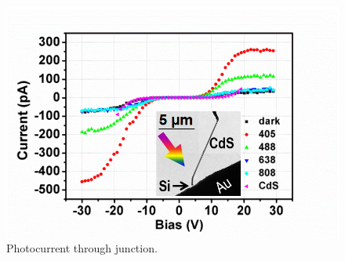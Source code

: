 \begin{figure}  
\includegraphics[width=\textwidth]{figures/figure3_3}
\caption[Photocurrent through junction.]{Photocurrent through junction.
\label{fig:fig3_3}}
\end{figure}

